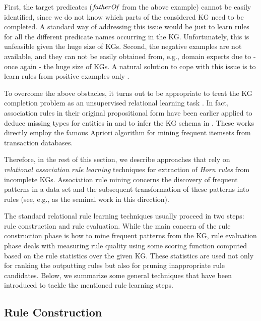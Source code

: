  First, the target predicates ($\mathit{fatherOf}$ from the above example) cannot be easily identified, since we do not know which parts of the considered KG need to be completed. A standard way of addressing this issue would be just to learn rules for all the different predicate names occurring in the KG. Unfortunately, this is unfeasible given the huge size of KGs. Second, the negative examples are not available,
 and they can not be easily obtained from, e.g., domain experts due to - once again
 - the huge size of KGs. A natural solution to cope with this issue is to learn rules
from positive examples only \cite{DBLP:conf/ilp/Muggleton96}. 

To overcome the above obstacles, it turns out to be appropriate to treat
the KG completion problem as an unsupervised relational learning task \cite{amie}.
In fact, association rules in their original propositional form have been earlier applied to deduce missing types for entities in \cite{typeinduction} and to
infer the KG schema in \cite{statisticalschema}. These works directly employ the famous Apriori algorithm for mining frequent itemsets from transaction databases.

Therefore, in the rest of this section, we describe approaches that rely on \emph{relational association rule learning} techniques for extraction of \emph{Horn rules} from incomplete KGs. 
Association rule mining concerns the discovery of frequent patterns in a data set and the subsequent transformation of these patterns into rules
(see, e.g., \cite{DBLP:conf/ilp/DehaspeR97} as the seminal work in this direction).%


The standard relational rule learning techniques usually proceed in two steps: rule construction and rule evaluation. While the main concern of the rule construction phase is how to mine frequent patterns from the KG, 
rule evaluation phase deals with measuring rule quality 
using some scoring function computed based on the rule statistics over the given KG. These statistics are used not only for ranking the outputting rules but also for pruning inappropriate rule candidates. Below, we summarize some general techniques that have been introduced to tackle the mentioned rule learning steps.

\subsection{Rule Construction}

